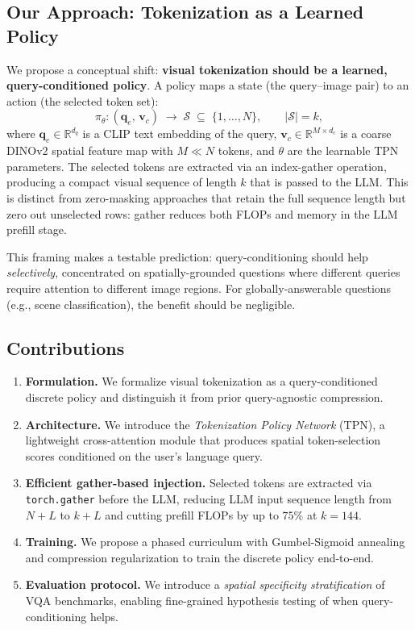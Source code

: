 \documentclass[11pt,a4paper]{article}
\newcommand{\R}{\mathbb{R}}
\newcommand{\vc}{\mathbf{v}_c}
\newcommand{\qe}{\mathbf{q}_e}
\begin{document}
\subsection{Our Approach: Tokenization as a Learned Policy}

We propose a conceptual shift: \textbf{visual tokenization should be a
learned, query-conditioned policy}.
A policy maps a state (the query--image pair) to an action (the selected
token set):
\begin{equation}
  \pi_\theta\colon (\qe,\, \vc) \;\longrightarrow\;
    \mathcal{S} \;\subseteq\; \{1, \ldots, N\},
    \qquad |\mathcal{S}| = k,
  \label{eq:policy_def}
\end{equation}
where $\qe \in \R^{d_q}$ is a CLIP text embedding of the query,
$\vc \in \R^{M \times d_c}$ is a coarse DINOv2 spatial feature map with
$M \ll N$ tokens, and $\theta$ are the learnable TPN parameters.
The selected tokens are extracted via an index-gather operation, producing
a compact visual sequence of length $k$ that is passed to the LLM.
This is distinct from zero-masking approaches that retain the full sequence
length but zero out unselected rows: gather reduces both FLOPs and memory in
the LLM prefill stage.

This framing makes a testable prediction: query-conditioning should help
\emph{selectively}, concentrated on spatially-grounded questions where
different queries require attention to different image regions.
For globally-answerable questions (e.g., scene classification), the benefit
should be negligible.

\subsection{Contributions}

\begin{enumerate}[leftmargin=1.5em, itemsep=2pt]
  \item \textbf{Formulation.}
    We formalize visual tokenization as a query-conditioned discrete policy
    and distinguish it from prior query-agnostic compression.
  \item \textbf{Architecture.}
    We introduce the \emph{Tokenization Policy Network} (TPN), a lightweight
    cross-attention module that produces spatial token-selection scores
    conditioned on the user's language query.
  \item \textbf{Efficient gather-based injection.}
    Selected tokens are extracted via \texttt{torch.gather} before the LLM,
    reducing LLM input sequence length from $N{+}L$ to $k{+}L$ and cutting
    prefill FLOPs by up to $75\%$ at $k{=}144$.
  \item \textbf{Training.}
    We propose a phased curriculum with Gumbel-Sigmoid annealing and
    compression regularization to train the discrete policy end-to-end.
  \item \textbf{Evaluation protocol.}
    We introduce a \emph{spatial specificity stratification} of VQA
    benchmarks, enabling fine-grained hypothesis testing of when
    query-conditioning helps.
\end{enumerate}
\end{document}
